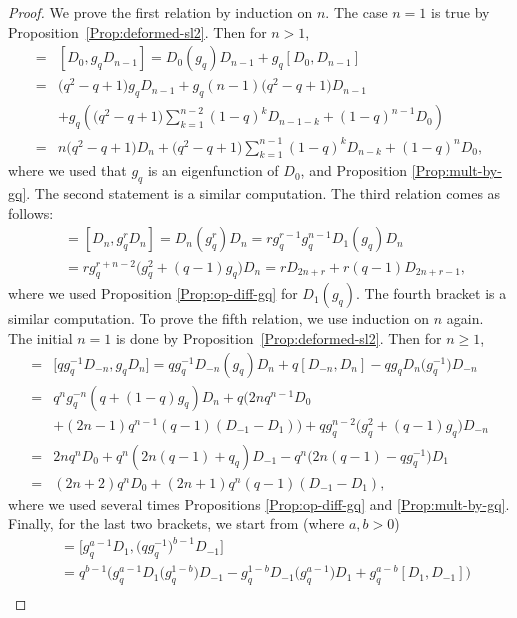 \documentclass[pdftex]{sigma}
\numberwithin{equation}{section}
\begin{document}
\begin{proof}
We prove the first relation by induction on $n$. The case $n=1$ is true by Proposition~\ref{Prop:deformed-sl2}. Then for $n>1$,
\begin{align*}
[D_0,D_n] ={}& [D_0,g_qD_{n-1}] = D_0(g_q)D_{n-1}+g_q[D_0,D_{n-1}]\\
={}& \big(q^2-q+1\big)g_qD_{n-1}+g_q(n-1)\big(q^2-q+1\big)D_{n-1} \\
& +g_q\left(\big(q^2-q+1\big)\displaystyle\sum_{k=1}^{n-2}(1-q)^kD_{n-1-k}+(1-q)^{n-1}D_0\right)\\
={}&n\big(q^2-q+1\big)D_n+\big(q^2-q+1\big)\displaystyle\sum_{k=1}^{n-1}(1-q)^kD_{n-k}+(1-q)^nD_0,
\end{align*}
where we used that $g_q$ is an eigenfunction of $D_0$, and Proposition \ref{Prop:mult-by-gq}.
The second statement is a similar computation.
The third relation comes as follows:
\begin{align*}
[D_n,D_{n+r}]&=[D_n,g_q^rD_n]=D_n(g_q^r)D_n=rg_q^{r-1}g_q^{n-1}D_1(g_q)D_n\\
&=rg_q^{r+n-2}\big(g_q^2+(q-1)g_q\big)D_n = rD_{2n+r}+r(q-1)D_{2n+r-1},
\end{align*}
where we used Proposition \ref{Prop:op-diff-gq} for $D_1(g_q)$. The fourth bracket is a similar computation.
To prove the fifth relation, we use induction on $n$ again. The initial $n=1$ is done by Proposition~\ref{Prop:deformed-sl2}. Then for $n\geq 1$,
\begin{align*}
[D_{-n-1},D_{n+1}]={}& \big[qg_q^{-1}D_{-n},g_qD_n\big]=qg_q^{-1}D_{-n}(g_q)D_n+q[D_{-n},D_n]-qg_qD_n\big(g_q^{-1}\big)D_{-n}\\
={}& q^ng_q^{-n}(q+(1- q)g_q)D_n+q\big(2nq^{n-1}D_0\\
&+(2n- 1)q^{n-1}(q-1)(D_{-1}-D_1)\big) +qg_q^{n-2}\big(g_q^2+(q-1)g_q\big)D_{-n}\\
={}& 2nq^nD_0+q^n(2n(q-1)+q_q)D_{-1}-q^n\big(2n(q-1)-qg_q^{-1}\big)D_1\\
={}&(2n+2)q^nD_0+(2n+1)q^n(q-1)(D_{-1}-D_1),
\end{align*}
where we used several times Propositions \ref{Prop:op-diff-gq} and \ref{Prop:mult-by-gq}. Finally, for the last two brackets, we start from (where $a,b>0$)
\begin{align}
[D_a,D_{-b}]&=\big[g_q^{a-1}D_1,\big(qg_q^{-1}\big)^{b-1}D_{-1}\big] \nonumber\\
&=q^{b-1}\big(g_q^{a-1}D_1\big(g_q^{1-b}\big)D_{-1}-g_q^{1-b}D_{-1}\big(g_q^{a-1}\big)D_1+g_q^{a-b}[D_1,D_{-1}]\big)\nonumber\\

\end{align}
\end{proof}
\end{document}
